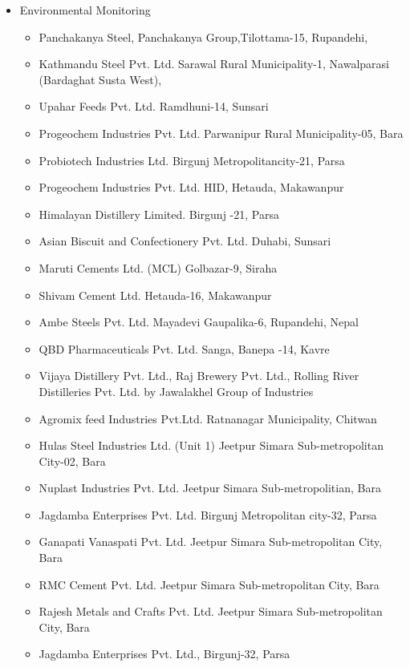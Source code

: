 \documentclass[a4paper, 09pt]{extarticle}
\begin{document}
\begin{itemize}
\begin{itemize}
    \end{itemize}
    \item Environmental Monitoring
    \begin{itemize}
        \item Panchakanya Steel, Panchakanya Group,Tilottama-15, Rupandehi,
        \item Kathmandu Steel Pvt. Ltd. Sarawal Rural Municipality-1, Nawalparasi (Bardaghat Susta West),
        \item Upahar Feeds Pvt. Ltd. Ramdhuni-14, Sunsari
        \item Progeochem Industries Pvt. Ltd. Parwanipur Rural Municipality-05, Bara
        \item Probiotech Industries Ltd. Birgunj Metropolitancity-21, Parsa
        \item Progeochem Industries Pvt. Ltd. HID, Hetauda, Makawanpur
        \item Himalayan Distillery Limited. Birgunj -21, Parsa
        \item Asian Biscuit and Confectionery Pvt. Ltd. Duhabi, Sunsari
        \item Maruti Cements Ltd. (MCL) Golbazar-9, Siraha
        \item Shivam Cement Ltd. Hetauda-16, Makawanpur
        \item Ambe Steels Pvt. Ltd. Mayadevi Gaupalika-6, Rupandehi, Nepal
        \item QBD Pharmaceuticals Pvt. Ltd. Sanga, Banepa -14, Kavre
        \item Vijaya Distillery Pvt. Ltd., Raj Brewery Pvt. Ltd., Rolling River Distilleries Pvt. Ltd. by Jawalakhel Group of Industries
        \item Agromix feed Industries Pvt.Ltd. Ratnanagar Municipality, Chitwan
        \item Hulas Steel Industries Ltd. (Unit 1) Jeetpur Simara Sub-metropolitan City-02, Bara
        \item Nuplast Industries Pvt. Ltd. Jeetpur Simara Sub-metropolitian, Bara
        \item Jagdamba Enterprises Pvt. Ltd. Birgunj Metropolitan city-32, Parsa
        \item Ganapati Vanaspati Pvt. Ltd. Jeetpur Simara Sub-metropolitan City, Bara
        \item RMC Cement Pvt. Ltd. Jeetpur Simara Sub-metropolitan City, Bara
        \item Rajesh Metals and Crafts Pvt. Ltd. Jeetpur Simara Sub-metropolitan City, Bara
        \item Jagdamba Enterprises Pvt. Ltd., Birgunj-32, Parsa

\end{itemize}
\end{itemize}
\end{document}
